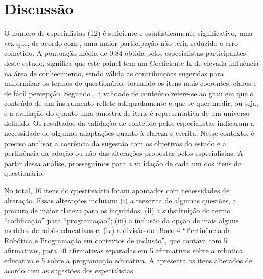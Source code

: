 \documentclass[portuguese]{textolivre}
\begin{document}
\section{Discussão}\label{sec-organizacao-latex}
O número de especialistas (12) é suficiente e estatisticamente significativo, uma vez que, de acordo com \textcite{landeta_metodo_1999}, uma maior participação não teria reduzido o erro cometido. A pontuação média de 0,84 obtida pelos especialistas participantes deste estudo, significa que este painel tem um Coeficiente K de elevada influência na área de conhecimento, sendo válida as contribuições sugeridas para uniformizar os termos do questionário, tornando os itens mais coerentes, claros e de fácil percepção. Segundo \textcite{souza_propriedades_2017}, a validade de conteúdo refere-se ao grau em que o conteúdo de um instrumento reflete adequadamente o que se quer medir, ou seja, é a avaliação do quanto uma amostra de itens é representativa de um universo definido. Os resultados da validação de conteúdo pelos especialistas indicaram a necessidade de algumas adaptações quanto à clareza e escrita. Nesse contexto, é preciso analisar a coerência da sugestão com os objetivos do estudo e a pertinência da adoção ou não das alterações propostas pelos especialistas. A partir dessa análise, prosseguimos para a validação de cada um dos itens do questionário.

No total, 10 itens do questionário foram apontados com necessidades de alteração. Essas alterações incluíam: (i) a reescrita de algumas questões, a procura de maior clareza para os inquiridos; (ii) a substituição do termo “codificação” para “programação”; (iii) a inclusão da opção de mais alguns modelos de robôs educativos e; (iv) a divisão do Bloco 4 “Pertinência da Robótica e Programação em contextos de inclusão”, que contava com 5 afirmativas, para 10 afirmativas separadas em 5 afirmativas sobre a robótica educativa e 5 sobre a programação educativa. A  apresenta os itens alterados de acordo com as sugestões dos especialistas.
\end{document}
